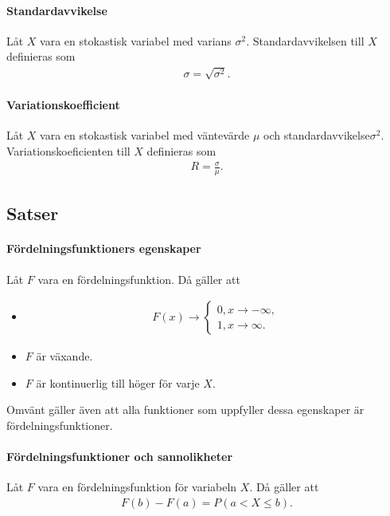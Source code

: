 \paragraph{Standardavvikelse}
Låt $X$ vara en stokastisk variabel med varians $\sigma^2$. Standardavvikelsen till $X$ definieras som
\begin{align*}
	\sigma = \sqrt{\sigma^2}.
\end{align*}

\paragraph{Variationskoefficient}
Låt $X$ vara en stokastisk variabel med väntevärde $\mu$ och standardavvikelse$\sigma^2$. Variationskoeficienten till $X$ definieras som
\begin{align*}
	R = \frac{\sigma}{\mu}.
\end{align*}

\subsection{Satser}

\paragraph{Fördelningsfunktioners egenskaper}
Låt $F$ vara en fördelningsfunktion. Då gäller att
\begin{itemize}
	\item
	\begin{align*}
		F(x)\to
		\begin{cases}
			0, x\to -\infty, \\
			1, x\to\infty.
		\end{cases}
	\end{align*}
	\item $F$ är växande.
	\item $F$ är kontinuerlig till höger för varje $X$.
\end{itemize}
Omvänt gäller även att alla funktioner som uppfyller dessa egenskaper är fördelningsfunktioner.

\proof

\paragraph{Fördelningsfunktioner och sannolikheter}
Låt $F$ vara en fördelningsfunktion för variabeln $X$. Då gäller att
\begin{align*}
	F(b) - F(a) = P(a < X\leq b).
\end{align*}

